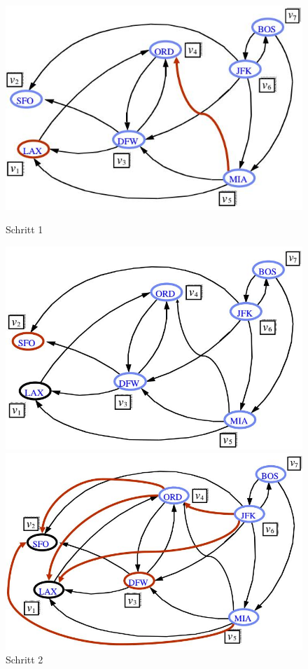 \begin{figure}[ht!]
	\centering
	\begin{minipage}[t]{0.4\textwidth}
		\centering
		\includegraphics[width=\linewidth]{images/floyd-warshal}
		\caption{Schritt 1}
		\label{fig:floyd-warshal}
	\end{minipage}
	\begin{minipage}[t]{0.4\textwidth}
		\centering
		\includegraphics[width=\linewidth]{images/floyd-warshal_v2}
		\caption{Schritt 2}
		\label{fig:floyd-warshalv2}
	\end{minipage}
	\begin{minipage}[t]{0.4\textwidth}
		\centering
		\includegraphics[width=\linewidth]{images/floyd-warshal_v3}

\end{minipage}
\end{figure}
